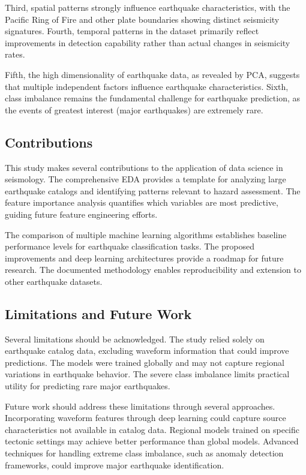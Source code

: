 Third, spatial patterns strongly influence earthquake characteristics, with the Pacific Ring of Fire and other plate boundaries showing distinct seismicity signatures. Fourth, temporal patterns in the dataset primarily reflect improvements in detection capability rather than actual changes in seismicity rates.

Fifth, the high dimensionality of earthquake data, as revealed by PCA, suggests that multiple independent factors influence earthquake characteristics. Sixth, class imbalance remains the fundamental challenge for earthquake prediction, as the events of greatest interest (major earthquakes) are extremely rare.

\subsection{Contributions}

This study makes several contributions to the application of data science in seismology. The comprehensive EDA provides a template for analyzing large earthquake catalogs and identifying patterns relevant to hazard assessment. The feature importance analysis quantifies which variables are most predictive, guiding future feature engineering efforts.

The comparison of multiple machine learning algorithms establishes baseline performance levels for earthquake classification tasks. The proposed improvements and deep learning architectures provide a roadmap for future research. The documented methodology enables reproducibility and extension to other earthquake datasets.

\subsection{Limitations and Future Work}

Several limitations should be acknowledged. The study relied solely on earthquake catalog data, excluding waveform information that could improve predictions. The models were trained globally and may not capture regional variations in earthquake behavior. The severe class imbalance limits practical utility for predicting rare major earthquakes.

Future work should address these limitations through several approaches. Incorporating waveform features through deep learning could capture source characteristics not available in catalog data. Regional models trained on specific tectonic settings may achieve better performance than global models. Advanced techniques for handling extreme class imbalance, such as anomaly detection frameworks, could improve major earthquake identification.

